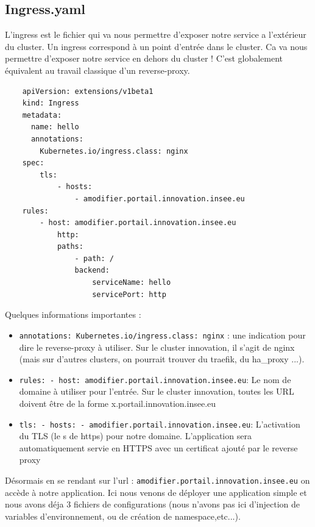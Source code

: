 \documentclass[11pt,fleqn]{book} %
\begin{document}
\subsection*{Ingress.yaml}
L'ingress est le fichier qui va nous permettre d'exposer notre service a l'extérieur du cluster. Un ingress correspond à un point d'entrée dans le cluster. Ca va nous permettre d'exposer notre service en dehors du cluster ! C'est globalement équivalent au travail classique d'un reverse-proxy.

\begin{verbatim}
    apiVersion: extensions/v1beta1
    kind: Ingress
    metadata:
      name: hello
      annotations:
        Kubernetes.io/ingress.class: nginx
    spec:
        tls:
            - hosts:
                - amodifier.portail.innovation.insee.eu
    rules:
        - host: amodifier.portail.innovation.insee.eu
            http:
            paths:
                - path: /
                backend:
                    serviceName: hello
                    servicePort: http
\end{verbatim}
Quelques informations importantes :

\begin{itemize}
    \item \texttt{annotations: Kubernetes.io/ingress.class: nginx} : une indication pour dire le reverse-proxy à utiliser. Sur le cluster innovation, il s'agit de nginx (mais sur d'autres clusters, on pourrait trouver du traefik, du ha\_proxy ...).
    \item \texttt{rules: - host: amodifier.portail.innovation.insee.eu}: Le nom de domaine à utiliser pour l'entrée. Sur le cluster innovation, toutes les URL doivent être de la forme x.portail.innovation.insee.eu
    \item \texttt{tls: - hosts: - amodifier.portail.innovation.insee.eu}: L'activation du TLS (le s de https) pour notre domaine. L'application sera automatiquement servie en HTTPS avec un certificat ajouté par le reverse proxy
\end{itemize}

Désormais en se rendant sur l'url : \texttt{amodifier.portail.innovation.insee.eu} on accède à notre application. Ici nous venons de déployer une application simple et nous avons déja 3 fichiers de configurations (nous n'avons pas ici d'injection de variables d'environnement, ou de création de namespace,etc...).\newline
\end{document}
